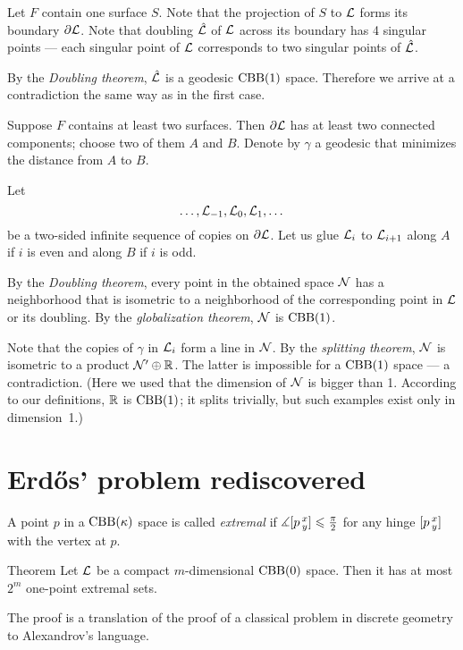 Let $F$ contain one surface $S$.
Note that the projection of $S$ to $\mathcal{L}$ forms its boundary $\partial \mathcal{L}$.
Note that doubling $\hat {\mathcal{L}}$ of $\mathcal{L}$ across its boundary has 4 singular points --- each singular point of $\mathcal{L}$ corresponds to two singular points of $\hat {\mathcal{L}}$.

By the \emph{Doubling theorem}, $\hat {\mathcal{L}}$ is a geodesic $\mathrm{CBB}(1)$ space.
Therefore we arrive at a contradiction the same way as in the first case.

Suppose $F$ contains at least two surfaces.
Then $\partial\mathcal{L}$ has at least two connected components; choose two of them $A$ and $B$.
Denote by $\gamma$ a geodesic that minimizes the distance from $A$ to $B$.

Let 
\[\dots,\mathcal{L}_{-1},\mathcal{L}_{0},\mathcal{L}_{1},\dots\]
be a two-sided infinite sequence of copies on $\partial\mathcal{L}$.
Let us glue $\mathcal{L}_{i}$ to $\mathcal{L}_{i+1}$ along $A$ if $i$ is even and along $B$ if $i$ is odd.

By the \emph{Doubling theorem}, every point in the obtained space $\mathcal{N}$ has a neighborhood that is isometric to a neighborhood of the corresponding point in $\mathcal{L}$ or its doubling.
By the \emph{globalization theorem}, $\mathcal{N}$ is $\mathrm{CBB}(1)$.

Note that the copies of $\gamma$ in $\mathcal{L}_{i}$ form a line in $\mathcal{N}$.
By the \emph{splitting theorem}, $\mathcal{N}$ is isometric to a product $\mathcal{N}'\oplus \mathbb{R}$.
The latter is impossible for a $\mathrm{CBB}(1)$ space --- a contradiction.
(Here we used that the dimension of $\mathcal{N}$ is bigger than 1.
According to our definitions, $\mathbb{R}$ is $\mathrm{CBB}(1)$;
it splits trivially, but such examples exist only in dimension~1.)
\qeds


\section{Erd\H{o}s' problem rediscovered}

A point $p$ in a $\mathrm{CBB}(\kappa)$ space is called \emph{extremal} if $\measuredangle[p\,{}^{x}_{y}]\leqslant \tfrac\pi2$ for any hinge $[p\,{}^{x}_{y}]$ with the vertex at $p$. 

\begin{thm}{Theorem}\label{thm:extr-point}
Let $\mathcal{L}$ be a compact $m$-dimensional $\mathrm{CBB}(0)$ space.
Then it has at most $2^m$ one-point extremal sets.
\end{thm}


The proof is a translation of the proof of a classical problem in discrete geometry to Alexandrov's language.

